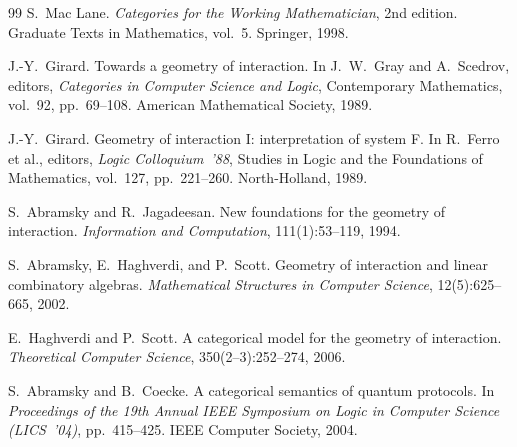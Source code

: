 \documentclass[11pt]{article}
\theoremstyle{definition}
\theoremstyle{plain}
\begin{document}
\begin{thebibliography}{99}
S.~Mac Lane.
\newblock \emph{Categories for the Working Mathematician}, 2nd edition.
\newblock Graduate Texts in Mathematics, vol.~5. Springer, 1998.

J.-Y.~Girard.
\newblock Towards a geometry of interaction.
\newblock In J.~W.~Gray and A.~Scedrov, editors, \emph{Categories in Computer
  Science and Logic}, Contemporary Mathematics, vol.~92, pp.~69--108.
  American Mathematical Society, 1989.

J.-Y.~Girard.
\newblock Geometry of interaction I: interpretation of system F.
\newblock In R.~Ferro et al., editors, \emph{Logic Colloquium~'88}, Studies
  in Logic and the Foundations of Mathematics, vol.~127, pp.~221--260.
  North-Holland, 1989.

S.~Abramsky and R.~Jagadeesan.
\newblock New foundations for the geometry of interaction.
\newblock \emph{Information and Computation}, 111(1):53--119, 1994.

S.~Abramsky, E.~Haghverdi, and P.~Scott.
\newblock Geometry of interaction and linear combinatory algebras.
\newblock \emph{Mathematical Structures in Computer Science},
  12(5):625--665, 2002.

E.~Haghverdi and P.~Scott.
\newblock A categorical model for the geometry of interaction.
\newblock \emph{Theoretical Computer Science}, 350(2--3):252--274, 2006.

S.~Abramsky and B.~Coecke.
\newblock A categorical semantics of quantum protocols.
\newblock In \emph{Proceedings of the 19th Annual IEEE Symposium on Logic in
  Computer Science (LICS~'04)}, pp.~415--425. IEEE Computer Society, 2004.

\end{thebibliography}
\end{document}
